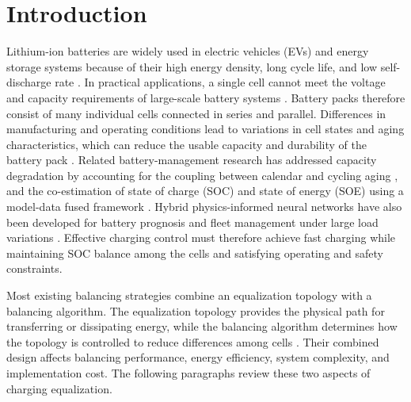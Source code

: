 \section{Introduction}

Lithium-ion batteries are widely used in electric vehicles (EVs) and energy storage systems because of their high energy density, long cycle life, and low self-discharge rate \cite{1}. In practical applications, a single cell cannot meet the voltage and capacity requirements of large-scale battery systems \cite{3, 4}. Battery packs therefore consist of many individual cells connected in series and parallel. Differences in manufacturing and operating conditions lead to variations in cell states and aging characteristics, which can reduce the usable capacity and durability of the battery pack \cite{4}. Related battery-management research has addressed capacity degradation by accounting for the coupling between calendar and cycling aging \cite{liu2024degradation}, and the co-estimation of state of charge (SOC) and state of energy (SOE) using a model-data fused framework \cite{duan2026coestimation}. Hybrid physics-informed neural networks have also been developed for battery prognosis and fleet management under large load variations \cite{fricke2026prognosis}. Effective charging control must therefore achieve fast charging while maintaining SOC balance among the cells and satisfying operating and safety constraints.

Most existing balancing strategies combine an equalization topology with a balancing algorithm. The equalization topology provides the physical path for transferring or dissipating energy, while the balancing algorithm determines how the topology is controlled to reduce differences among cells \cite{7, 8}. Their combined design affects balancing performance, energy efficiency, system complexity, and implementation cost. The following paragraphs review these two aspects of charging equalization.


